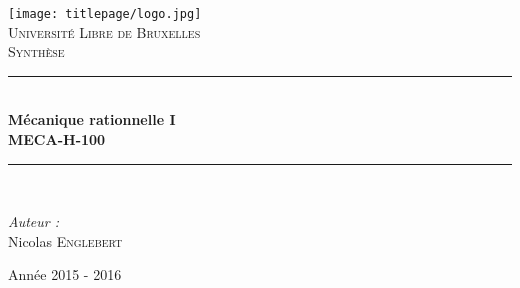 \AddToShipoutPicture*{\BackgroundPic}
\begin{titlepage}
	\begin{center}	
			
		\newcommand{\HRule}{\rule{\linewidth}{0.5mm}}   			            %
		\texttt{[image: titlepage/logo.jpg]}~\\[1cm]				%
			
			\textsc{\LARGE Université Libre de Bruxelles}\\[1.5cm]
			\textsc{\Large Synthèse}\\[0.5cm]
			
			\HRule \\[0.4cm]
			{ \huge \bfseries Mécanique rationnelle I \ \\MECA-H-100 \\[0.4cm] }
			
			
			\HRule \\[1.5cm]
			\begin{minipage}{0.4\textwidth}
				\begin{flushleft} \large
							
					\emph{Auteur :}\\
					Nicolas \textsc{Englebert}
					
				\end{flushleft}
			\end{minipage}
			\begin{minipage}{0.4\textwidth}
				\begin{flushright} \large
				\end{flushright}
			\end{minipage}
			
			\vfill
			
			{\large Année 2015 - 2016}
			
		\end{center}
	\end{titlepage}
